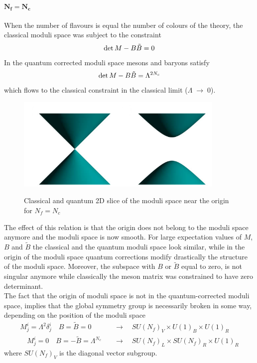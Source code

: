 \paragraph{$\mathbf{ N_f = N_c}$}
When the number of flavours is equal the number of colours of the theory, the classical moduli space was subject to the constraint
\begin{equation}
 \mathrm{det } \,{M} - B \tilde{B} = 0
\end{equation}
In the quantum corrected moduli space mesons and baryons satisfy \cite{Seiberg:1994bz}
\begin{equation}
 \mathrm{det } \,{M} - B \tilde{B} = \Lambda^{2 N_c}
\end{equation}
which flows to the classical constraint in the classical limit ($\Lambda \; \rightarrow \;0$).
\\
\begin{figure}
\centering
{\includegraphics[width=10cm]{terning.png} }
{\caption{ Classical and quantum 2D slice of the moduli space near the origin for $N_f = N_c$}}
\end{figure}
The effect of this relation is that the origin  does not belong to the moduli space anymore and the moduli space is now smooth.
For large expectation values of $M$, $B$ and $\tilde{B}$ the classical and the quantum moduli space look similar, while in the origin of the moduli space quantum corrections modify drastically the structure of the moduli space.
Moreover, the subspace with $B$ or $\tilde{B}$ equal to zero, is not singular anymore while classically the meson matrix was constrained to have zero determinant. 
\\
The fact that the origin of moduli space is not in the quantum-corrected moduli space, implies that the global symmetry group is necessarily broken in some way, depending on the position of the moduli space 
\begin{align}
M^i_j = \Lambda^2 \delta^i_j \quad B=\tilde{B}= 0 \quad & \rightarrow  \quad SU(N_f)_V \times U(1)_B \times U(1)_R\\
\quad M^i_j = 0 \quad B=-\tilde{B}= \Lambda^{N_c} \quad & \rightarrow  \quad SU(N_f)_L \times SU(N_f)_R \times U(1)_R
\end{align}
where $SU(N_f)_V$ is the diagonal vector subgroup.
\\
